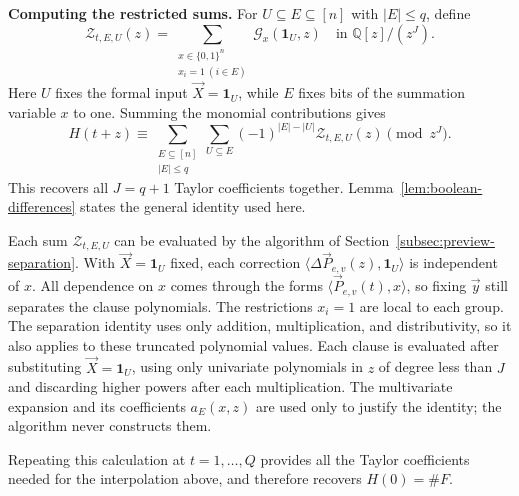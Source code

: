 \documentclass[11pt,reqno]{amsart}
\numberwithin{equation}{section}
\theoremstyle{definition}\newtheorem{definition}[theorem]{Definition}
\theoremstyle{remark}\newtheorem{remark}[theorem]{Remark}
\renewcommand{\le}{\leqslant}
\begin{document}
\smallskip\noindent
\textbf{Computing the restricted sums.}
For $U\subseteq E\subseteq[n]$ with $|E|\le q$, define
\begin{equation}\label{eq:outline-restricted-taylor-sum}
 \mathcal Z_{t,E,U}(z)=
 \sum_{\substack{x\in\{0,1\}^n\\x_i=1\ (i\in E)}}
                    \mathcal G_x(\mathbf1_U,z)
       \quad\text{in }\mathbb Q[z]/(z^J).
\end{equation}
Here $U$ fixes the formal input $\vec X=\mathbf1_U$, while $E$
fixes bits of the summation variable $x$ to one.
Summing the monomial contributions gives
\begin{equation}\label{eq:outline-taylor-recovery}
 H(t+z)\equiv
 \sum_{\substack{E\subseteq[n]\\|E|\le q}}
       \sum_{U\subseteq E}(-1)^{|E|-|U|}
                         \mathcal Z_{t,E,U}(z)\pmod{z^J}.
\end{equation}
This recovers all $J=q+1$ Taylor coefficients together.
Lemma~\ref{lem:boolean-differences} states the general identity
used here.

Each sum $\mathcal Z_{t,E,U}$ can be evaluated by the algorithm
of Section~\ref{subsec:preview-separation}. With
$\vec X=\mathbf1_U$ fixed, each correction
$\langle\Delta\vec P_{e,v}(z),\mathbf1_U\rangle$ is independent of $x$.
All dependence on $x$ comes through the forms
$\langle\vec P_{e,v}(t),x\rangle$, so fixing $\vec y$ still separates
the clause polynomials. The restrictions $x_i=1$ are local to each
group. The separation identity uses only addition, multiplication,
and distributivity, so it also applies to these truncated polynomial
values. Each clause is evaluated after substituting
$\vec X=\mathbf1_U$, using only univariate polynomials in $z$
of degree less than $J$ and discarding higher powers after each
multiplication. The multivariate expansion and its coefficients
$a_E(x,z)$ are used only to justify the identity; the algorithm
never constructs them.

Repeating this calculation at $t=1,\ldots,Q$ provides all the
Taylor coefficients needed for the interpolation above, and
therefore recovers $H(0)=\#F$.
\end{document}
